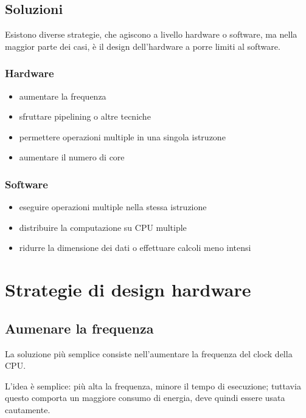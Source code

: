 \subsection{Soluzioni}

Esistono diverse strategie, che agiscono a livello hardware o software, ma nella maggior parte dei casi, è il design dell'hardware a porre limiti al software.

\subsubsection{Hardware}

\begin{itemize}
    \item aumentare la frequenza
    \item sfruttare pipelining o altre tecniche
    \item permettere operazioni multiple in una singola istruzone
    \item aumentare il numero di core
\end{itemize}

\subsubsection{Software}

\begin{itemize}
    \item eseguire operazioni multiple nella stessa istruzione
    \item distribuire la computazione su CPU multiple
    \item ridurre la dimensione dei dati o effettuare calcoli meno intensi
\end{itemize}

\section{Strategie di design hardware}

\subsection{Aumenare la frequenza}
La soluzione più semplice consiste nell'aumentare la frequenza del clock della CPU.

L'idea è semplice: più alta la frequenza, minore il tempo di esecuzione; tuttavia questo comporta un maggiore consumo di energia, deve quindi essere usata cautamente.

